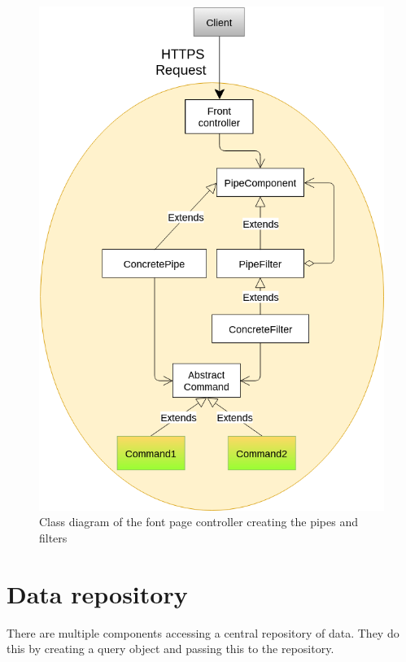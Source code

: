 \begin{figure}[H]
\centering
\includegraphics[width=0.8\linewidth]{7-software/images/FrontClasses.png}
\caption{Class diagram of the font page controller creating the pipes and filters}
\label{fig:frontclasses}
\end{figure}


\section{Data repository}

There are multiple components accessing a central repository of data. They do this by creating a query object and passing this to the repository. 

